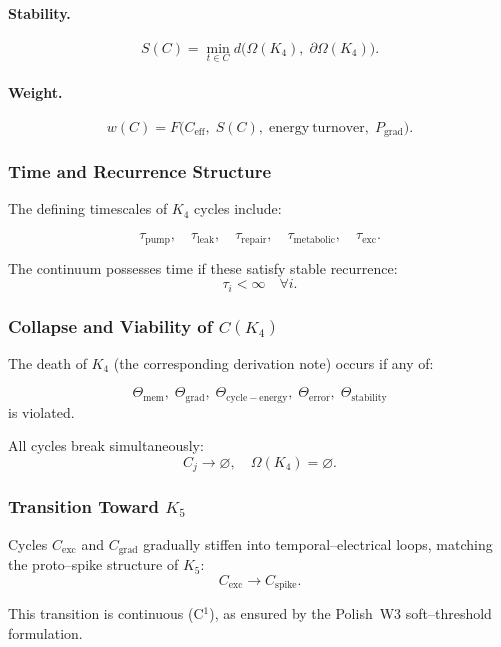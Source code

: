 \paragraph{Stability.}
\[
  S(C)
   = \min_{t\in C}
       d\bigl(
         \Omega(K_4),\;
         \partial\Omega(K_4)
       \bigr).
\]

\paragraph{Weight.}
\[
  w(C)=F\bigl(
        C_{\mathrm{eff}},\;
        S(C),\;
        \mathrm{energy\ turnover},\;
        P_{\mathrm{grad}}
      \bigr).
\]

\subsubsection{Time and Recurrence Structure}

The defining timescales of $K_4$ cycles include:

\[
  \tau_{\mathrm{pump}},\quad
  \tau_{\mathrm{leak}},\quad
  \tau_{\mathrm{repair}},\quad
  \tau_{\mathrm{metabolic}},\quad
  \tau_{\mathrm{exc}}.
\]

The continuum possesses time if these satisfy stable recurrence:
\[
  \tau_i<\infty \quad\forall i.
\]

\subsubsection{Collapse and Viability of \texorpdfstring{$C(K_4)$}{C(K_4)}}

The death of $K_4$ (the corresponding derivation note) occurs if any of:

\[
  \Theta_{\mathrm{mem}},\;
  \Theta_{\mathrm{grad}},\;
  \Theta_{\mathrm{cycle-energy}},\;
  \Theta_{\mathrm{error}},\;
  \Theta_{\mathrm{stability}}
\]
is violated.

All cycles break simultaneously:
\[
  C_j \to \varnothing,
\quad
  \Omega(K_4)=\varnothing.
\]

\subsubsection{Transition Toward \texorpdfstring{$K_5$}{K_5}}

Cycles $C_{\mathrm{exc}}$ and $C_{\mathrm{grad}}$ gradually
stiffen into temporal–electrical loops, matching the
proto–spike structure of $K_5$:
\[
  C_{\mathrm{exc}}\longrightarrow C_{\mathrm{spike}}.
\]

This transition is continuous (C$^1$), as ensured by
the Polish~W3 soft–threshold formulation.
